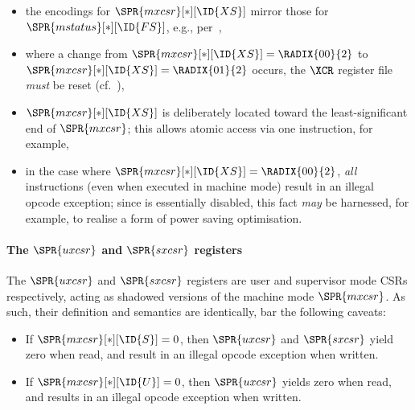 \begin{itemize}
      \begin{itemize}
      \item the encodings for
            $\SPR{mxcsr}[*][\ID{XS}]$
            mirror those for 
            $\SPR{mstatus}[*][\ID{FS}]$,
            e.g., per~\cite[Section 3.1.6.5]{SCARV:RV:ISA:II:17},
      \item where a change from
            $\SPR{mxcsr}[*][\ID{XS}] = \RADIX{00}{2}$
            to
            $\SPR{mxcsr}[*][\ID{XS}] = \RADIX{01}{2}$
            occurs, 
            the $\XCR$ register file {\em must} be reset (cf.~),
      \item $\SPR{mxcsr}[*][\ID{XS}]$ is deliberately located toward the
            least-significant end of $\SPR{mxcsr}$; this allows atomic 
            access via one  instruction, for example,
      \item in the case where
            $\SPR{mxcsr}[*][\ID{XS}] = \RADIX{00}{2}$,
            {\em all} \XCID instructions (even when executed in machine
            mode) result in an illegal opcode exception; since \XCID is
            essentially disabled, this fact {\em may} be harnessed, for 
            example, to realise a form of power saving optimisation.
      \end{itemize}            

\end{itemize}

\paragraph{The $\SPR{uxcsr}$ and $\SPR{sxcsr}$ registers}

The 
$\SPR{uxcsr}$ 
and 
$\SPR{sxcsr}$ 
registers are user and supervisor mode CSRs respectively, acting as
shadowed versions of the machine mode $\SPR{mxcsr}$.  As such, their
definition and semantics are identically, bar the following caveats:

\begin{itemize}
\item If
      $\SPR{mxcsr}[*][\ID{S}] = 0$,
      then
      $\SPR{uxcsr}$ 
      and 
      $\SPR{sxcsr}$ 
      yield  zero when read, 
      and result  in an illegal opcode exception when written.
\item If
      $\SPR{mxcsr}[*][\ID{U}] = 0$,
      then
      $\SPR{uxcsr}$ 
      yields zero when read, 
      and results in an illegal opcode exception when written.
\end{itemize}

